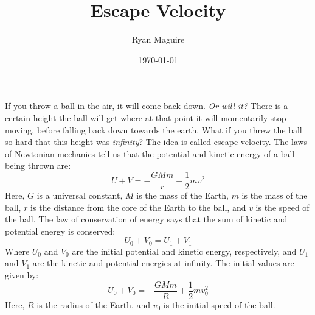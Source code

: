 \documentclass{article}
\title{Escape Velocity}
\author{Ryan Maguire}
\date{\today}
\begin{document}
    \maketitle
    If you throw a ball in the air, it will come back down.
    \textit{Or will it?} There is a certain height the ball will get
    where at that point it will momentarily stop moving, before
    falling back down towards the earth. What if you threw the ball so hard
    that this height was \textit{infinity}? The idea is called escape velocity.
    The laws of Newtonian mechanics tell us that the potential and kinetic
    energy of a ball being thrown are:
    \begin{equation}
        U+V=-\frac{GMm}{r}+\frac{1}{2}mv^{2}
    \end{equation}
    Here, $G$ is a universal constant, $M$ is the mass of the Earth, $m$ is the
    mass of the ball, $r$ is the distance from the core of the Earth to the
    ball, and $v$ is the speed of the ball. The law of conservation of energy
    says that the sum of kinetic and potential energy is conserved:
    \begin{equation}
        U_{0}+V_{0}=U_{1}+V_{1}
    \end{equation}
    Where $U_{0}$ and $V_{0}$ are the initial potential and kinetic energy,
    respectively, and $U_{1}$ and $V_{1}$ are the kinetic
    and potential energies at infinity. The initial values are given by:
    \begin{equation}
        U_{0}+V_{0}=-\frac{GMm}{R}+\frac{1}{2}mv_{0}^{2}
    \end{equation}
    Here, $R$ is the radius of the Earth, and $v_{0}$ is the initial speed of
    the ball.
    \par\hfill\par
\end{document}
